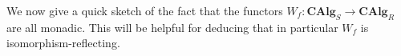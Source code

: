 \documentclass{amsart}
\theoremstyle{definition}
\DeclareMathOperator{\id}{id}
\DeclareMathOperator{\Crig}{\mathbf{Crig}}
\DeclareMathOperator{\Cring}{\mathbf{Cring}}
\DeclareMathOperator{\CCalg}{\mathcal{CAlg}}
\newcommand{\CAlg}[1]{\mathbf{CAlg}_{#1}}
\numberwithin{equation}{subsection}
\begin{document}
%

We now give a quick sketch of the fact that the functors $W_f:\CAlg{S} \to \CAlg{R}$ are all monadic. This will be helpful for deducing that in particular $W_f$ is isomorphism-reflecting.
\end{document}
